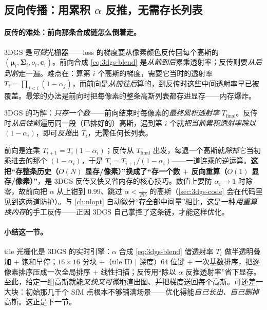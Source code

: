 \subsection{反向传播：用累积 \texorpdfstring{$\alpha$}{alpha} 反推，无需存长列表}

\paragraph{反传的难处：前向那条合成链怎么倒着走。}
3DGS 是\emph{可微}光栅器——loss 的梯度要从像素颜色反传回每个高斯的 $(\boldsymbol\mu_i,\boldsymbol\Sigma_i,o_i,\mathbf c_i)$。前向合成 \cref{eq:3dgs-blend} 是\emph{从前到后}累乘透射率；反传则要\emph{从后到前}走一遍。难点在：算第 $i$ 个高斯的梯度，需要它当时的透射率 $T_i=\prod_{j<i}(1-\alpha_j)$，而前向是\emph{从前往后}算的，到反传时这些中间透射率早已被覆盖。最笨的办法是前向时把每像素的整条高斯列表都存进显存——内存爆炸。

3DGS 的巧解：\emph{只存一个数}——前向结束时每像素的\emph{最终累积透射率} $T_{\text{final}}$。反传时\emph{从后往前}遍历同一段（已排好的）高斯，遇到第 $i$ 个就\emph{把当前累积透射率除以 $(1-\alpha_i)$}，即可\emph{反推}出 $T_i$，无需任何长列表。

\begin{insight}
前向是连乘 $T_{i+1}=T_i(1-\alpha_i)$；反传从 $T_{\text{final}}$ 出发，每退一个高斯就\emph{除掉}它当初乘进去的那个 $(1-\alpha_i)$，于是 $T_i=T_{i+1}/(1-\alpha_i)$——一道连乘的逆运算。\textbf{这把“存整条历史（$O(N)$ 显存/像素）”换成了“存一个数 $+$ 反向重算（$O(1)$ 显存/像素）”}，是 3DGS 反传又快又省内存的核心技巧。数值上要防 $\alpha_i\to1$ 时除零，故前向把 $\alpha$ 从上钳到 $0.99$、跳过 $\alpha<\tfrac{1}{255}$ 的高斯（\cref{sec:3dgs-code} 会在代码里见到这两道防护）。与 \cref{ch:nlopt} 自动微分“存全部中间量”相比，这是一种\emph{用重算换内存}的手工反传——正因 3DGS 自己掌控了这条链，才能这样优化。
\end{insight}

\paragraph{小结这一节。}
tile 光栅化是 3DGS 的实时引擎：$\alpha$ 合成 \cref{eq:3dgs-blend} 借透射率 $T_i$ 做半透明叠加 $+$ 饱和早停；$16\times16$ 分块 $+$（tile ID $|$ 深度）$64$ 位键 $+$ 一次基数排序，把逐像素排序压成一次全局排序 $+$ 线性扫描；反传用“除以 $\alpha$ 反推透射率”省下显存。至此，给定一组高斯就能\emph{又快又可微}地渲出图、并把梯度送回每个高斯。可还差一大块：初始那几千个 SfM 点根本不够铺满场景——优化得能\emph{自己长出、自己删掉}高斯。这正是下一节。

